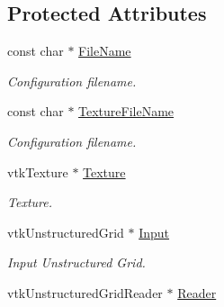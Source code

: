 \subsection*{Protected Attributes}
\begin{DoxyCompactItemize}
\item 
\hypertarget{classvtkOrgan_ac507b85e8e446dc2b05f8eddd19653b5}{
const char $\ast$ \hyperlink{classvtkOrgan_ac507b85e8e446dc2b05f8eddd19653b5}{FileName}}
\label{classvtkOrgan_ac507b85e8e446dc2b05f8eddd19653b5}

\begin{DoxyCompactList}\small\item\em Configuration filename. \item\end{DoxyCompactList}\item 
\hypertarget{classvtkOrgan_a5ba85412383cd85fd110823131dd2c5d}{
const char $\ast$ \hyperlink{classvtkOrgan_a5ba85412383cd85fd110823131dd2c5d}{TextureFileName}}
\label{classvtkOrgan_a5ba85412383cd85fd110823131dd2c5d}

\begin{DoxyCompactList}\small\item\em Configuration filename. \item\end{DoxyCompactList}\item 
\hypertarget{classvtkOrgan_a77f4c261f73869b78984aff6f5597275}{
vtkTexture $\ast$ \hyperlink{classvtkOrgan_a77f4c261f73869b78984aff6f5597275}{Texture}}
\label{classvtkOrgan_a77f4c261f73869b78984aff6f5597275}

\begin{DoxyCompactList}\small\item\em Texture. \item\end{DoxyCompactList}\item 
\hypertarget{classvtkOrgan_a836e81a6d9c895711ffafc1de711d6d7}{
vtkUnstructuredGrid $\ast$ \hyperlink{classvtkOrgan_a836e81a6d9c895711ffafc1de711d6d7}{Input}}
\label{classvtkOrgan_a836e81a6d9c895711ffafc1de711d6d7}

\begin{DoxyCompactList}\small\item\em Input Unstructured Grid. \item\end{DoxyCompactList}\item 
\hypertarget{classvtkOrgan_a33ff99e7696564f2e80d7497ae70b991}{
vtkUnstructuredGridReader $\ast$ \hyperlink{classvtkOrgan_a33ff99e7696564f2e80d7497ae70b991}{Reader}}
\label{classvtkOrgan_a33ff99e7696564f2e80d7497ae70b991}


\end{DoxyCompactItemize}
